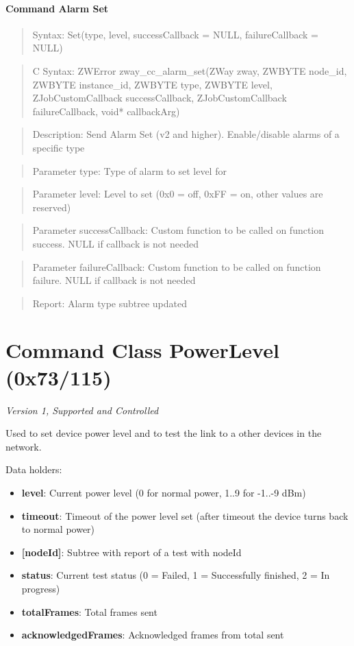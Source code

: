 \paragraph{Command Alarm Set}
\begin{quote}Syntax: Set(type, level, successCallback = NULL, failureCallback = NULL)\end{quote}
\begin{quote}C Syntax: ZWError zway\_cc\_alarm\_set(ZWay zway, ZWBYTE node\_id, ZWBYTE instance\_id, ZWBYTE type, ZWBYTE level, ZJobCustomCallback successCallback, ZJobCustomCallback failureCallback, void* callbackArg)\end{quote}
\begin{quote}Description: Send Alarm Set (v2 and higher). Enable/disable alarms of a specific type\end{quote}
\begin{quote}Parameter type: Type of alarm to set level for\end{quote}
\begin{quote}Parameter level: Level to set (0x0 = off, 0xFF = on, other values are reserved)\end{quote}
\begin{quote}Parameter successCallback: Custom function to be called on function success. NULL if callback is not needed\end{quote}
\begin{quote}Parameter failureCallback: Custom function to be called on function failure. NULL if callback is not needed\end{quote}
\begin{quote}Report: Alarm type subtree updated\end{quote}


\section{Command Class PowerLevel (0x73/115)}

\textit{Version 1, Supported and Controlled}
\newline

Used to set device power level and to test the link to a other devices in the network.
\newline

\noindent
Data holders:

\begin{itemize}
\item \textbf{level}: Current power level (0 for normal power, 1..9 for -1..-9 dBm)
\item \textbf{timeout}: Timeout of the power level set (after timeout the device turns back to normal power)
\item \textbf{[nodeId]}: Subtree with report of a test with nodeId
\item \qquad\textbf{status}: Current test status (0 = Failed, 1 = Successfully finished, 2 = In progress)
\item \qquad\textbf{totalFrames}: Total frames sent
\item \qquad\textbf{acknowledgedFrames}: Acknowledged frames from total sent
\end{itemize}

